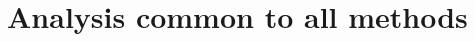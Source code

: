 \documentclass[9pt]{livecoms}
\begin{document}
\section{Analysis common to all methods}

%

\clearpage

\renewcommand\bibnumfmt[1]{#1.}


\end{document}
